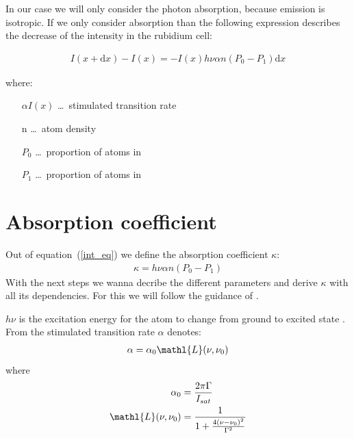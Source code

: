In our case we will only consider the photon absorption, because emission is isotropic. If we
only consider absorption than the following expression describes the decrease of the
intensity in the rubidium cell:

\begin{align}
    I(x+\mathrm{d}x)-I(x) = - I(x) h\nu \alpha n  (P_0-P_1) \mathrm{d}x \label{int_eq}
\end{align}

where:
\begin{itemize}
    \setlength{\itemsep}{0ex}
    \item[\(\alpha I(x)\)]\ldots~stimulated transition rate
    \item[n]\ldots~atom density
    \item[\(P_0\)]\ldots~proportion of atoms in 
    \item[\(P_1\)]\ldots~proportion of atoms in 
\end{itemize}
\pagebreak
\section{Absorption coefficient}  %
Out of equation~(\ref{int_eq}) we define the absorption coefficient \(\kappa \):
\begin{align}
    \kappa = h\nu \alpha n  (P_0-P_1) \label{kappa}
\end{align}
With the next steps we wanna decribe the different parameters and derive \(\kappa \) with all
its dependencies. For this we will follow the guidance of \citep{SAS}.
\bigskip

\(h\nu \) is the excitation energy for the atom to change from ground  to excited state . \\
From the stimulated transition rate \(\alpha \) denotes:
\begin{align}
    \alpha = \alpha_0 \mathl{L}(\nu,\nu_0)
\end{align}
where
\begin{align}
    \alpha_0 &= \frac{2\pi\Gamma}{I_{sat}} \\
    \mathl{L}(\nu,\nu_0) &= \frac{1}{ 1+\frac{ 4{(\nu-\nu_0)}^2 }{\Gamma^2} }
\end{align}


